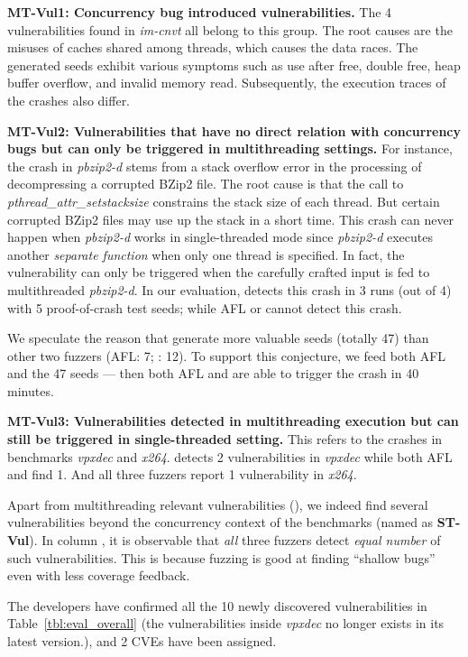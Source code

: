 \textbf{MT-Vul1: Concurrency bug introduced vulnerabilities.} 
The 4 vulnerabilities found in \emph{im-cnvt} all belong to this group. The root causes are the misuses of caches shared among threads, which causes the data races. The generated seeds  exhibit various symptoms such as use after free, double free, heap buffer overflow, and 
invalid memory read. Subsequently, the execution traces of the crashes also differ.

\textbf{MT-Vul2: Vulnerabilities that have no direct relation with concurrency bugs but can only be triggered in multithreading settings.}
For instance, the crash in \emph{pbzip2-d} stems from a stack overflow error in the processing of decompressing a corrupted BZip2 file. The root cause is that the call to \emph{pthread\_attr\_setstacksize} constrains the 
stack size of each thread. But certain corrupted BZip2 files may use up the stack in a short
time. This crash can never happen when \emph{pbzip2-d} works in single-threaded mode since \emph{pbzip2-d} executes another \emph{separate function} when only one thread is specified.  In fact, the vulnerability can only be triggered when the carefully crafted input is fed to
multithreaded \emph{pbzip2-d}. In our evaluation, \mtfuzz detects this crash in 3 runs (out of 4) 
with 5 proof-of-crash test seeds; while AFL or \mtfuzzc cannot detect this crash. 

We speculate the reason that \mtfuzz generate more valuable seeds (totally 47) than other two 
fuzzers (AFL: 7; \mtfuzzc: 12). To support this conjecture, we feed both AFL and \mtfuzzc the 47 
\mtfuzz seeds --- then both AFL and \mtfuzzc are able to trigger the crash in 40 minutes.


\textbf{MT-Vul3: Vulnerabilities detected in multithreading execution but can still be triggered 
in single-threaded setting.} This refers to the crashes in benchmarks \emph{vpxdec} and \emph{x264}. 
\mtfuzz detects 2 vulnerabilities in \emph{vpxdec} while both AFL and \mtfuzzc find 1. And all three
fuzzers report 1 vulnerability in \emph{x264}.

Apart from multithreading relevant vulnerabilities (\vulsMT), we indeed find several vulnerabilities beyond the concurrency context of the benchmarks (named as \textbf{ST-Vul}). In column \vulsST, it is observable 
that \emph{all} three fuzzers detect \emph{equal number} of such vulnerabilities. 
This is because fuzzing is good at finding ``shallow bugs''~\cite{driller} even with less coverage 
feedback.

The developers have confirmed all the 10 newly discovered vulnerabilities in Table~\ref{tbl:eval_overall} (the vulnerabilities inside \emph{vpxdec} no longer exists in its latest version.), 
and 2 CVEs have been assigned.


